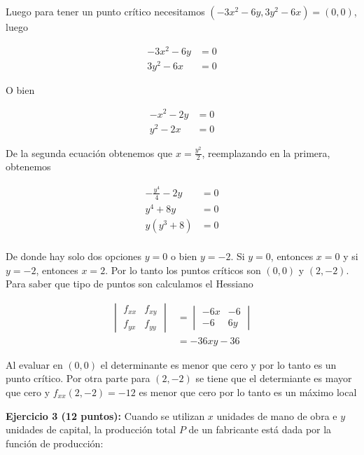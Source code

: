 \documentclass[a4paper]{article}
\begin{document}
Luego para tener un punto crítico necesitamos  $(-3x^2-6y, 3y^2-6x)=(0,0)$, luego

\begin{align*}
    -3x^2-6y &=0 \\
    3y^2-6x &=0
\end{align*}

O bien

\begin{align*}
    -x^2-2y &=0 \\
    y^2-2x &=0
\end{align*}

De la segunda ecuación obtenemos que $x = \frac{y^2}{2}$, reemplazando en la primera, obtenemos


\begin{align*}
    -\frac{y^4}{4}-2y &=0 \\
    y^4+8y &=0 \\
    y(y^3+8) &=0 \\
\end{align*}

De donde hay solo dos opciones $y=0$ o bien $y=-2$. Si $y=0$, entonces $x=0$ y si $y=-2$, entonces $x=2$. Por lo tanto los puntos críticos son $(0,0)$ y $(2,-2)$. Para saber que tipo de puntos son calculamos el Hessiano

\begin{align*}
    \begin{vmatrix}
        f_{xx} & f_{xy} \\
        f_{yx} & f_{yy}
    \end{vmatrix} &= \begin{vmatrix}
        -6x & -6 \\
        -6 & 6y
    \end{vmatrix} \\
    &= -36xy-36
\end{align*}

Al evaluar en $(0,0)$ el determinante es menor que cero y por lo tanto es un punto crítico. Por otra parte para $(2,-2)$ se tiene que el determiante es mayor que cero y $f_{xx}(2,-2) =-12$ es menor que cero por lo tanto es un máximo local



\newpage



\textbf{Ejercicio 3 (12 puntos):} Cuando se utilizan $x$ unidades de mano de obra e $y$ unidades de capital, la producción total $P$ de un fabricante está dada por la función de producción:
\end{document}
